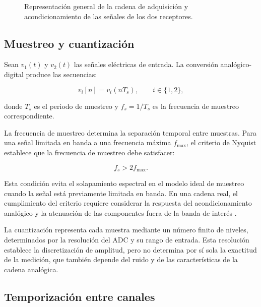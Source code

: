 \begin{figure}[htbp]
    \centering
    
    \vspace{0.3cm}
    \caption{Representación general de la cadena de adquisición y
    acondicionamiento de las señales de los dos receptores.}
    \label{fig:discretizacion_flujo}
\end{figure}

\subsection*{Muestreo y cuantización}

Sean $v_1(t)$ y $v_2(t)$ las señales eléctricas de entrada. La conversión
analógico-digital produce las secuencias:

\begin{equation}
    v_i[n]
    =
    v_i(nT_s),
    \qquad i\in\{1,2\},
    \label{eq:operador_muestreo}
\end{equation}

donde $T_s$ es el periodo de muestreo y $f_s=1/T_s$ es la frecuencia
de muestreo correspondiente.

La frecuencia de muestreo determina la separación temporal entre
muestras. Para una señal limitada en banda a una frecuencia máxima
$f_{\max}$, el criterio de Nyquist establece que la frecuencia de
muestreo debe satisfacer:

\begin{equation}
    f_s>2f_{\max}.
    \label{eq:nyquist}
\end{equation}

Esta condición evita el solapamiento espectral en el modelo ideal de
muestreo cuando la señal está previamente limitada en banda. En una
cadena real, el cumplimiento del criterio requiere considerar la
respuesta del acondicionamiento analógico y la atenuación de las
componentes fuera de la banda de interés
\cite{oppenheim1999discrete,lyons2010understanding}.

La cuantización representa cada muestra mediante un número finito de
niveles, determinados por la resolución del ADC y su rango de entrada.
Esta resolución establece la discretización de amplitud, pero no
determina por sí sola la exactitud de la medición, que también depende
del ruido y de las características de la cadena analógica.

\subsection*{Temporización entre canales}

